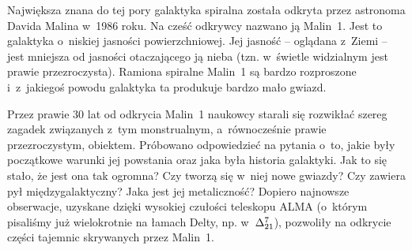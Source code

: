 \def\xhref#1#2{\href{#1}{\hskip16pt}\llap{#2}}
\def\xxhref#1#2{\href{#1}{\hskip14pt}\llap{#2}}
\makeatletter
\def\@oddhead{\hfill}
\def\@evenhead{\hfill}
\makeatother
   
   
\normalsize
\fontsize{9.6}{11.6}\selectfont





Największa znana do tej pory galaktyka spiralna została odkryta przez astronoma Davida Malina w~1986 roku. 
Na cześć odkrywcy nazwano ją Malin~1. Jest to galaktyka o~niskiej jasności powierzchniowej. Jej jasność – oglądana z~Ziemi – jest mniejsza od jasności otaczającego ją nieba (tzn. w~świetle widzialnym jest prawie przezroczysta). Ramiona spiralne Malin~1 są bardzo rozproszone i~z~jakiegoś powodu galaktyka ta produkuje bardzo mało gwiazd. 

Przez prawie 30 lat od odkrycia Malin~1 naukowcy starali się rozwikłać szereg zagadek związanych z~tym monstrualnym, a~równocześnie prawie przezroczystym, obiektem.  
Próbowano odpowiedzieć na pytania o~to, jakie były początkowe warunki jej powstania oraz jaka była historia galaktyki. Jak to się stało, że jest ona tak ogromna? Czy tworzą się w~niej nowe gwiazdy? Czy zawiera pył międzygalaktyczny? Jaka jest jej metaliczność?
Dopiero najnowsze obserwacje, uzyskane dzięki wysokiej czułości teleskopu ALMA (o~którym pisaliśmy już wielokrotnie na łamach Delty, np. w~\href{https://www.deltami.edu.pl/2021/07/astronomia-milimetrowa-obserwatorium-alma/}{$\Delta^7\sb{21}$}), pozwoliły na odkrycie części tajemnic skrywanych przez Malin~1.   

